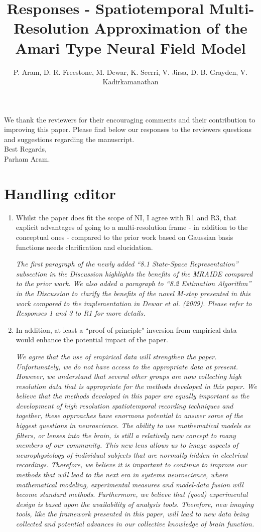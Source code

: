 \documentclass{article}
\title{Responses - Spatiotemporal Multi-Resolution Approximation of the Amari Type Neural Field Model}
\author{ P. Aram, D. R. Freestone, M. Dewar, K. Scerri, V. Jirsa, D. B. Grayden, V. Kadirkamanathan}
\begin{document}
    \maketitle

    We thank the reviewers for their encouraging comments and their contribution to improving this paper. Please find below our responses to the reviewers questions and suggestions regarding the manuscript. 
\\

Best Regards,
\\

Parham Aram.

\section{Handling editor}
\begin{enumerate}
\item Whilst the paper does fit the scope of NI, I agree with R1 and R3, that explicit advantages of going to a multi-resolution frame - in addition to the conceptual ones - compared to the prior work based on Gaussian basis functions needs clarification and elucidation.
 
\emph{The first paragraph of the newly added ``8.1 State-Space Representation'' subsection in the Discussion  highlights the benefits of the MRAIDE compared to the prior work. We also added a paragraph to ``8.2 Estimation Algorithm'' in the Discussion to clarify the benefits of the novel M-step presented in this work compared to the implementation in Dewar et al. (2009). Please refer to Responses 1 and 3 to R1 for more details.}

\item  In addition, at least a ``proof of principle" inversion from empirical data would enhance the potential impact of the paper. 

\emph{We agree that the use of empirical data will strengthen the paper. Unfortunately, we do not have access to the appropriate data at present. However, we understand that several other groups are now collecting high resolution data that is appropriate for the methods developed in this paper. We believe that the methods developed in this paper are equally important as the development of high  resolution spatiotemporal recording techniques and together, these approaches have enormous potential to answer some of the biggest questions in neuroscience. The ability to use mathematical models as filters, or lenses into the brain, is still a relatively new concept to many members of our community. This new lens allows us to image aspects of neurophysiology of individual subjects that are normally hidden in electrical recordings. Therefore, we believe it is important to continue to improve our methods that will lead to the next era in systems neuroscience, where mathematical modeling, experimental measures and model-data fusion will become standard methods. Furthermore, we believe that (good) experimental design is based upon the availability of analysis tools. Therefore, new imaging tools, like the framework presented in this paper, will lead to new data being collected and potential advances in our collective knowledge of brain function.}
	

\end{enumerate}
\end{document}
